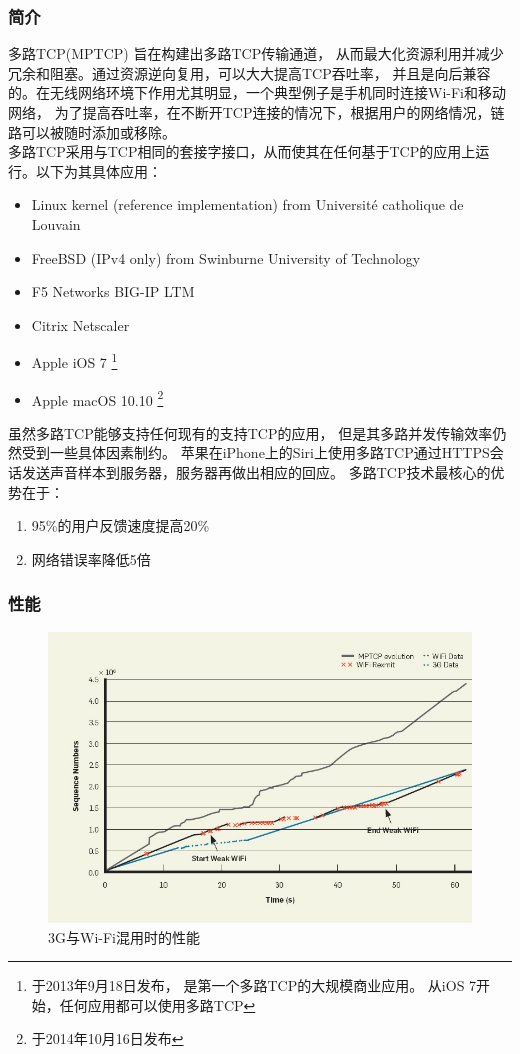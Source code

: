 \documentclass[11pt]{article}
\begin{document}
\subsubsection{简介}
多路TCP(MPTCP) 旨在构建出多路TCP传输通道，
从而最大化资源利用并减少冗余和阻塞。通过资源逆向复用，可以大大提高TCP吞吐率，
并且是向后兼容的。在无线网络环境下作用尤其明显，一个典型例子是手机同时连接Wi-Fi和移动网络，
为了提高吞吐率，在不断开TCP连接的情况下，根据用户的网络情况，链路可以被随时添加或移除。
\\
多路TCP采用与TCP相同的套接字接口，从而使其在任何基于TCP的应用上运行。以下为其具体应用：
\begin{itemize}
    \item Linux kernel (reference implementation) from Université catholique de Louvain
    \item FreeBSD (IPv4 only) from Swinburne University of Technology
    \item F5 Networks BIG-IP LTM
    \item Citrix Netscaler
    \item Apple iOS 7 \footnote{于2013年9月18日发布， 是第一个多路TCP的大规模商业应用。 从iOS 7开始，任何应用都可以使用多路TCP}
    \item Apple macOS 10.10 \footnote{于2014年10月16日发布}
\end{itemize}
虽然多路TCP能够支持任何现有的支持TCP的应用，
但是其多路并发传输效率仍然受到一些具体因素制约。
苹果在iPhone上的Siri上使用多路TCP通过HTTPS会话发送声音样本到服务器，服务器再做出相应的回应。
多路TCP技术最核心的优势在于：
\begin{enumerate}
\item 95\%的用户反馈速度提高20\%
\item 网络错误率降低5倍
\end{enumerate}
\subsubsection{性能}
\begin{figure}[H]
    \begin{center}
    \includegraphics[width=\textwidth]{figures//multitcp_performance.jpg}
    \caption{3G与Wi-Fi混用时的性能}
    \end{center}
\end{figure}
\end{document}
